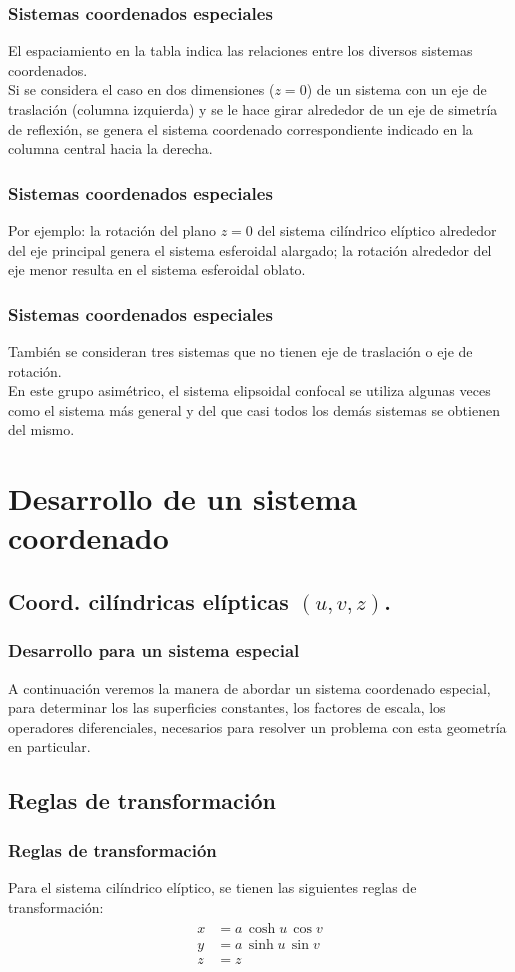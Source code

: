 \begin{frame}
\frametitle{Sistemas coordenados especiales}
El espaciamiento en la tabla indica las relaciones entre los diversos sistemas coordenados.
\\
\bigskip
Si se considera el caso en dos dimensiones ($z = 0$) de un sistema con un eje de traslación (columna izquierda) y se le hace girar alrededor de un eje de simetría de reflexión, se genera el sistema coordenado correspondiente indicado en la columna central hacia la derecha.
\end{frame}
\begin{frame}
\frametitle{Sistemas coordenados especiales}
Por ejemplo: la rotación del plano $z = 0$ del sistema cilíndrico elíptico alrededor del eje principal genera el sistema esferoidal alargado; la rotación alrededor del eje menor resulta en el sistema esferoidal oblato.
\end{frame}
\begin{frame}
\frametitle{Sistemas coordenados especiales}
También se consideran tres sistemas que no tienen eje de traslación o eje de rotación.
\\
\bigskip
En este grupo asimétrico, el sistema elipsoidal confocal se utiliza algunas veces como el sistema más general y del que casi todos los demás sistemas se obtienen del mismo.
\end{frame}

\section{Desarrollo de un sistema coordenado}
\subsection{Coord. cilíndricas elípticas \texorpdfstring{$(u, v, z)$}{(u, v, z)}.}

\begin{frame}
\frametitle{Desarrollo para un sistema especial}
A continuación veremos la manera de abordar un sistema coordenado especial, para determinar los las superficies constantes, los factores de escala, los operadores diferenciales, necesarios para resolver un problema con esta geometría en particular.
\end{frame}
\subsection{Reglas de transformación}
\begin{frame}
\frametitle{Reglas de transformación}
Para el sistema cilíndrico elíptico, se tienen las siguientes reglas de transformación:
\begin{align}
\begin{aligned}
x &= a \, \cosh u \, \cos v \\
y &= a \, \sinh u \, \sin v \\
z &= z
\end{aligned}
\label{eq:ecuacion_02_73_esp}
\end{align}
\end{frame}
